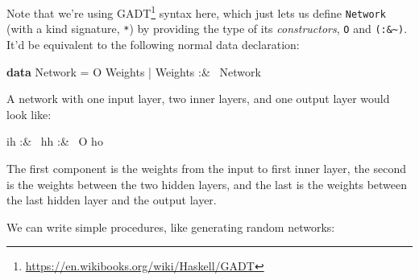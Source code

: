 \documentclass[]{article}
\newenvironment{Shaded}{}{}
\newcommand{\KeywordTok}[1]{\textcolor[rgb]{0.00,0.44,0.13}{\textbf{{#1}}}}
\newcommand{\DataTypeTok}[1]{\textcolor[rgb]{0.56,0.13,0.00}{{#1}}}
\newcommand{\FunctionTok}[1]{\textcolor[rgb]{0.02,0.16,0.49}{{#1}}}
\newcommand{\NormalTok}[1]{{#1}}
\renewcommand{\href}[2]{#2\footnote{\url{#1}}}
\begin{document}
Note that we're using \href{https://en.wikibooks.org/wiki/Haskell/GADT}{GADT}
syntax here, which just lets us define \texttt{Network} (with a kind signature,
\texttt{*}) by providing the type of its \emph{constructors}, \texttt{O} and
\texttt{(:\&\textasciitilde{})}. It'd be equivalent to the following normal data
declaration:

\begin{Shaded}
\begin{Highlighting}[]
\KeywordTok{data} \DataTypeTok{Network} \FunctionTok{=} \DataTypeTok{O} \DataTypeTok{Weights}
             \FunctionTok{|} \DataTypeTok{Weights} \FunctionTok{:&~} \DataTypeTok{Network}
\end{Highlighting}
\end{Shaded}

A network with one input layer, two inner layers, and one output layer would
look like:

\begin{Shaded}
\begin{Highlighting}[]
\NormalTok{ih }\FunctionTok{:&~} \NormalTok{hh }\FunctionTok{:&~} \DataTypeTok{O} \NormalTok{ho}
\end{Highlighting}
\end{Shaded}

The first component is the weights from the input to first inner layer, the
second is the weights between the two hidden layers, and the last is the weights
between the last hidden layer and the output layer.

We can write simple procedures, like generating random networks:
\end{document}

